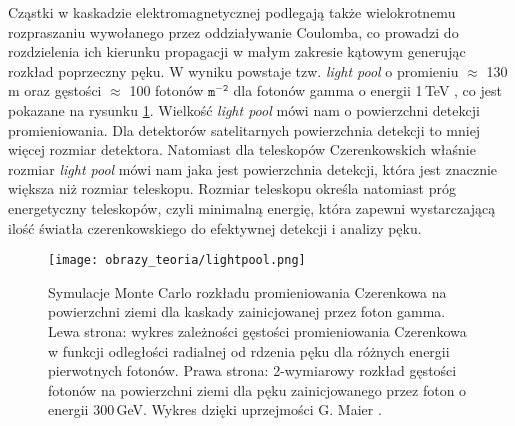 \documentclass[a4paper,11pt,twoside]{article}
\begin{document}
Cząstki w kaskadzie elektromagnetycznej podlegają także wielokrotnemu rozpraszaniu wywołanego przez oddziaływanie Coulomba, co prowadzi do rozdzielenia ich kierunku propagacji w małym zakresie kątowym generując rozkład poprzeczny pęku. W wyniku powstaje tzw. \textsl{light pool} o promieniu $\approx$ 130\,m oraz gęstości $\approx$ 100 fotonów $\mathtt{m^{-2}}$ dla fotonów gamma o energii 1\,TeV \cite{IACT}, co jest pokazane na rysunku \ref{fig:lightpool}. Wielkość \textsl{light pool} mówi nam o powierzchni detekcji promieniowania. Dla detektorów satelitarnych powierzchnia detekcji to mniej więcej rozmiar detektora. Natomiast dla teleskopów Czerenkowskich właśnie rozmiar \textsl{light pool} mówi nam jaka jest powierzchnia detekcji, która jest znacznie większa niż rozmiar teleskopu. Rozmiar teleskopu określa natomiast próg energetyczny teleskopów, czyli minimalną energię, która zapewni wystarczającą ilość światła czerenkowskiego do efektywnej detekcji i analizy pęku.
\begin{figure}[H] 
\centering
\texttt{[image: obrazy\_teoria/lightpool.png]}
\caption{Symulacje Monte Carlo rozkładu promieniowania Czerenkowa na powierzchni ziemi dla kaskady zainicjowanej przez foton gamma. Lewa strona: wykres zależności gęstości promieniowania Czerenkowa w funkcji odległości radialnej od rdzenia pęku dla różnych energii pierwotnych fotonów. Prawa strona: 2-wymiarowy rozkład gęstości fotonów na powierzchni ziemi dla pęku zainicjowanego przez foton o energii 300\,GeV. Wykres dzięki uprzejmości G. Maier \cite{IACT}.}
\label{fig:lightpool}
\end{figure}
\newpage
\end{document}
